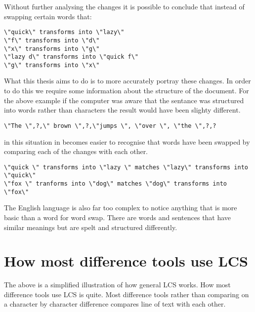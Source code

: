 Without further analysing the changes it is possible to conclude that instead of swapping certain words that:

\begin{verbatim}
\"quick\" transforms into \"lazy\"
\"f\" transforms into \"d\"
\"x\" transforms into \"g\"
\"lazy d\" transforms into \"quick f\"
\"g\" transforms into \"x\"
\end{verbatim}

What this thesis aims to do is to more accurately portray these changes.
In order to do this we require some information about the structure of the document.
For the above example if the computer was aware that the sentance was structured into words rather than characters the result would have been slighty different.

\begin{verbatim}
\"The \",?,\" brown \",?,\"jumps \", \"over \", \"the \",?,?
\end{verbatim}

in this situation in becomes easier to recognise that words have been swapped by comparing each of the changes with each other.  

\begin{verbatim}
\"quick \" transforms into \"lazy \" matches \"lazy\" transforms into \"quick\"
\"fox \" tranforms into \"dog\" matches \"dog\" transforms into \"fox\" 
\end{verbatim}

The English language is also far too complex to notice anything that is more basic than a word for word swap.
There are words and sentences that have similar meanings but are spelt and structured differently.

 
 



  

\section{How most difference tools use LCS}
The above is a simplified illustration of how general LCS works.
How most difference tools use LCS is quite.
Most difference tools rather than comparing on a character by character difference compares line of text with each other.

% 
 
 


